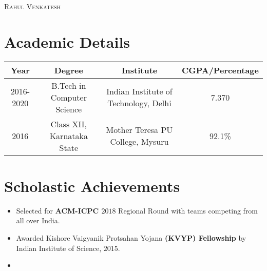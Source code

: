 \documentclass{article}
\begin{document}
\begin{center} {\Large \textsc{Rahul Venkatesh}}\end{center}

\section*{Academic Details}
\begin{center} \begin{tabular}{ |c | c | c | c |}
    \hline

    Year &
    Degree &
    Institute &
    CGPA/Percentage \\

    \hline

    2016-2020 &
    B.Tech in Computer Science &
    Indian Institute of Technology, Delhi &
    7.370 \\

    \hline

    2016 &
    Class XII,
    Karnataka State &
    Mother Teresa PU College, Mysuru &
    92.1\% \\

    \hline
\end{tabular} \end{center}

\section*{Scholastic Achievements}
\begin{itemize}[noitemsep,nolistsep]
    \item
        Selected for \textbf{ACM-ICPC $2018$} Regional Round with teams
        competing from all over India.
    \item
        Awarded Kishore Vaigyanik Protsahan Yojana \textbf{(KVYP) Fellowship} by
        Indian Institute of Science, $2015$.
    \item
\end{itemize}
\end{document}
